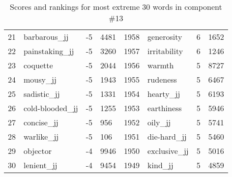 \begin{table}[tbp]
\begin{tabular}{| rlr@{.}l | rlr@{.}l |}
    21 & barbarous\_jj & -5 & 4481    &    1958 & generosity & 6 & 1652 \\
    22 & painstaking\_jj & -5 & 3260    &    1957 & irritability & 6 & 1246 \\
    23 & coquette & -5 & 2044    &    1956 & warmth & 5 & 8727 \\
    24 & mousy\_jj & -5 & 1943    &    1955 & rudeness & 5 & 6467 \\
    25 & sadistic\_jj & -5 & 1331    &    1954 & hearty\_jj & 5 & 6193 \\
    26 & cold-blooded\_jj & -5 & 1255    &    1953 & earthiness & 5 & 5946 \\
    27 & concise\_jj & -5 & 956    &    1952 & oily\_jj & 5 & 5741 \\
    28 & warlike\_jj & -5 & 106    &    1951 & die-hard\_jj & 5 & 5460 \\
    29 & objector & -4 & 9946    &    1950 & exclusive\_jj & 5 & 5016 \\
    30 & lenient\_jj & -4 & 9454    &    1949 & kind\_jj & 5 & 4859 \\
    \hline
    \end{tabular}
    \caption{Scores and rankings for most extreme 30 words in component \#13} 
\end{table}
\clearpage
